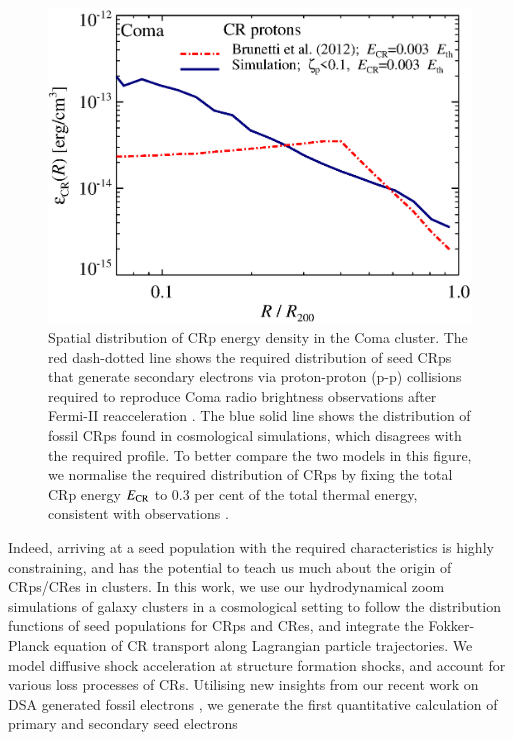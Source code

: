 \documentclass[fleqn,usenatbib,useAMS]{mnras}
\begin{document}
\begin{figure}
  \includegraphics[width=1.0\columnwidth]{fCR.radius.coma.g72a.Rad14.2400p.z0.NL.xKR.eb23.eI067.DII.140.v6.eps}
  \caption{Spatial distribution of CRp energy density in the Coma
    cluster. The red dash-dotted line shows the required distribution
    of seed CRps that generate secondary electrons via proton-proton
    (p-p) collisions required to reproduce Coma radio brightness
    observations after Fermi-II reacceleration \citep{brunetti12}. The
    blue solid line shows the distribution of fossil CRps found in
    cosmological simulations, which disagrees with the required
    profile. To better compare the two models in this figure, we
    normalise the required distribution of CRps by fixing the total
    CRp energy $E_{\mathrm{CR}}$ to 0.3 per cent of the total thermal
    energy, consistent with observations
    \citep{2014ApJ...787...18A,2012ApJ...757..123A}.}
  \label{fig:Edens}
\end{figure}

Indeed, arriving at a seed population with the required characteristics is
highly constraining, and has the potential to teach us much about the origin of
CRps/CRes in clusters.  In this work, we use our hydrodynamical zoom simulations
of galaxy clusters in a cosmological setting to follow the distribution
functions of seed populations for CRps and CRes, and integrate the Fokker-Planck
equation of CR transport along Lagrangian particle trajectories. We model
diffusive shock acceleration at structure formation shocks, and account for
various loss processes of CRs. Utilising new insights from our recent work on
DSA generated fossil electrons \citep{pinzke13}, we generate the first
quantitative calculation of primary and secondary seed electrons
\end{document}
